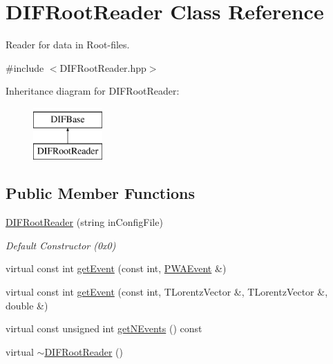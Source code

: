 \hypertarget{classDIFRootReader}{
\section{DIFRootReader Class Reference}
\label{dc/ddc/classDIFRootReader}
}


Reader for data in Root-\/files.  




{\ttfamily \#include $<$DIFRootReader.hpp$>$}

Inheritance diagram for DIFRootReader:\begin{figure}[H]
\begin{center}
\leavevmode
\includegraphics[height=2.000000cm]{dc/ddc/classDIFRootReader}
\end{center}
\end{figure}
\subsection*{Public Member Functions}
\begin{DoxyCompactItemize}
\item 
\hyperlink{classDIFRootReader_a627b25e9eba44a8485b445916f955333}{DIFRootReader} (string inConfigFile)
\begin{DoxyCompactList}\small\item\em Default Constructor (0x0) \end{DoxyCompactList}\item 
virtual const int \hyperlink{classDIFRootReader_a2469dc5451328c7e802f2ff540842082}{getEvent} (const int, \hyperlink{classPWAEvent}{PWAEvent} \&)
\item 
virtual const int \hyperlink{classDIFRootReader_a4d39cf2617a549c0fd6b097be8890756}{getEvent} (const int, TLorentzVector \&, TLorentzVector \&, double \&)
\item 
virtual const unsigned int \hyperlink{classDIFRootReader_a2cee7a677795a26ecef7cdf3129162ab}{getNEvents} () const 
\item 
virtual \hyperlink{classDIFRootReader_a3b2d897442630d757da57a3f2a83f7f3}{$\sim$DIFRootReader} ()
\end{DoxyCompactItemize}
